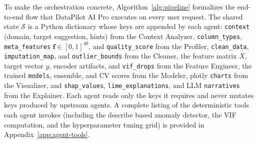 \documentclass{article}
\begin{document}
To make the orchestration concrete, Algorithm~\ref{alg:pipeline} formalizes the
end-to-end flow that DataPilot AI Pro executes on every user request. The
shared state $\mathcal{S}$ is a Python dictionary whose keys are appended by
each agent: \texttt{context} (domain, target suggestion, hints) from the
Context Analyzer, \texttt{column\_types}, \texttt{meta\_features}
$\mathbf{f}\in[0,1]^{40}$, and \texttt{quality\_score} from the Profiler,
\texttt{clean\_data}, \texttt{imputation\_map}, and \texttt{outlier\_bounds}
from the Cleaner, the feature matrix $X$, target vector $y$, encoder
artifacts, and \texttt{vif\_drops} from the Feature Engineer, the trained
\texttt{models}, ensemble, and CV scores from the Modeler, plotly
\texttt{charts} from the Visualizer, and \texttt{shap\_values},
\texttt{lime\_explanations}, and LLM \texttt{narratives} from the Explainer.
Each agent reads only the keys it requires and never mutates keys produced
by upstream agents. A complete listing of the deterministic tools each agent
invokes (including the describe based anomaly detector, the VIF computation,
and the hyperparameter tuning grid) is provided in Appendix~\ref{app:agent-tools}.
\end{document}
